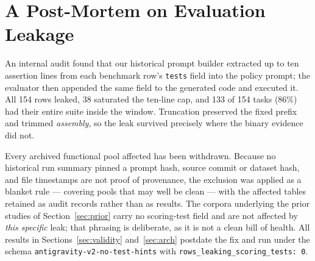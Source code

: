\documentclass[conference]{IEEEtran}
\begin{document}
\section{A Post-Mortem on Evaluation Leakage}
\label{sec:leak}
An internal audit found that our historical prompt builder extracted up to ten
assertion lines from each benchmark row's \texttt{tests} field into the policy
prompt; the evaluator then appended the same field to the generated code and
executed it. All 154 rows leaked, 38 saturated the ten-line cap, and 133 of 154
tasks (86\%) had their entire suite inside the window. Truncation preserved the
fixed prefix and trimmed \emph{assembly}, so the leak survived precisely where
the binary evidence did not.

Every archived functional pool affected has been withdrawn. Because no historical
run summary pinned a prompt hash, source commit or dataset hash, and file
timestamps are not proof of provenance, the exclusion was applied as a blanket
rule --- covering pools that may well be clean --- with the affected tables
retained as audit records rather than as results. The corpora underlying the
prior studies of Section~\ref{sec:prior} carry no scoring-test field and are not
affected by \emph{this specific} leak; that phrasing is deliberate, as it is not
a clean bill of health. All results in
Sections~\ref{sec:validity} and~\ref{sec:arch} postdate the fix and run under
the schema \texttt{antigravity-v2-no-test-hints} with
\texttt{rows\_leaking\_scoring\_tests: 0}.
\end{document}
